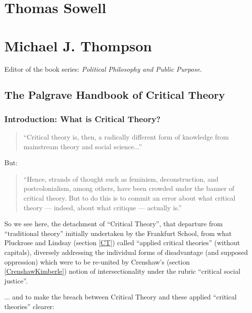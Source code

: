\documentclass[10pt,titlepage]{book}
\begin{document}
\section{Thomas Sowell}\label{SowellThomas}

\cite{sowell-barbarians}

\section{Michael J. Thompson}\label{ThompsonMichael}

Editor of the book series: \emph{Political Philosophy and Public Purpose}.

\subsection{The Palgrave Handbook of Critical Theory \cite{thompson-palcrit}}

\subsubsection{Introduction: What is Critical Theory?}

\begin{quotation}
``Critical theory is, then, a radically different form of knowledge from mainstream theory and social science...''
\end{quotation}

But:

\begin{quotation}
``Hence, strands of thought such as feminism, deconstruction, and postcolonialism, among others, have been crowded under the banner of critical theory. But to do this is to commit an error about what critical theory — indeed, about what critique — actually is.''
\end{quotation}

So we see here, the detachment of ``Critical Theory'', that departure from ``traditional theory'' initially undertaken by the Frankfurt School, from what Pluckrose and Lindsay \cite{pluckrose-cynical} (section \ref{CT}) called ``applied critical theories'' (without capitals), diversely addressing the individual forms of disadvantage (and supposed oppression) which were to be re-united by Crenshaw's (section \ref{CrenshawKimberle}) notion of intersectionality under the rubric ``critical social justice''.

... and to make the breach between Critical Theory and these applied ``critical theories'' clearer:
\end{document}
